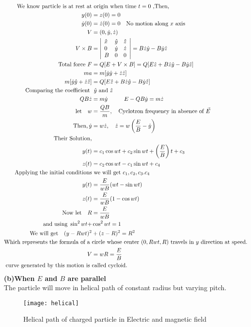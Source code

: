\begin{align*}
\text{We know particle is at rest at}&\text{ origin when time $t=0$ ,Then,} \\
y(0)&=z(0)=0\\
\dot{y}(0)&=\dot{z}(0)=0\quad\text{No motion along $x$ axis}\\
V&=(0,\dot{y},\dot{z})\\
V\times B&=\left|\begin{array}{lll}\hat{x} & \hat{y}&\hat{z} \\ 0 & \dot{y}&\dot{z} \\B & 0&0\end{array}\right|=B\dot{z}\hat{y}-B\dot{y}\hat{z}\\
\text{Total force}\ F&=Q[E+V\times B]=Q[E\hat{z}+B\dot{z}\hat{y}-B\dot{y}\hat{z}]\\
ma&=m[\dot{y}\hat{y}+\dot{z}\hat{z}]\\
m[\dot{y}\hat{y}+\dot{z}\hat{z}]&=Q[E\hat{z}+B\dot{z}\hat{y}-B\dot{y}\hat{z}]\\
\text{Comparing the coefficient }&\text{ $ \hat{y} $ and $ \hat{z} $}\\
QB\dot{z}&=m\dot{y}\hspace{1cm}E-QB\dot{y}=m\dot{z}\\
\text{let}\quad w&=\frac{QB}{m},\quad \text{Cyclotron frequency in absence of $\vec{E}$}\\
\text{Then}, \dot{y}&=w\dot{z},\quad \dot{z}=w\left( \frac{E}{B}-\dot{y}\right)\\ 
\text{Their Solution,}\\
y(t)&=c_1\cos wt+c_2\sin wt+\left( \frac{E}{B}\right) t+c_3\\
z(t)&=c_2\cos wt-c_1\sin wt+c_4\\
\text{Applying the initial  conditions}&\text{ we will get $ c_1,c_2,c_3.c_4 $}\\
y(t)&=\frac{E}{wB}(wt-\sin wt)\\
z(t)&=\frac{E}{wB}(1-\cos wt)\\
\text{Now let}\quad R&=\frac{E}{wB}\\
\text{and using }\sin^2wt+&\cos^2wt=1\\
\text{We will get}\quad (y-Rwt)^2&+(z-R)^2=R^2\\
\text{Which represents the formula of a }&\text{circle whose center $(0,Rwt,R)$ travels in $y$ direction at speed.}\\
 V&=wR=\frac{E}{B}\\
\text{curve generated by this motion is }&\text{called cycloid.}
\end{align*}
\textbf{(b)}\quad \textbf{When $E$ and $B$ are parallel}\\
The particle will move in helical path of constant radius but varying pitch.
\begin{figure}[H]
			\centering
		\texttt{[image: helical]}
		\caption{Helical path of charged particle in Electric and magnetic field}
		\label{Helical path}
	\end{figure}

